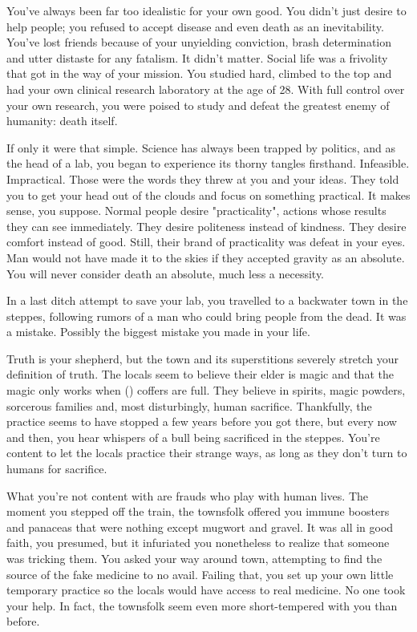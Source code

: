 \documentclass[char]{guildcamp4}
\begin{document}
\name{\cOutsider{}}

You've always been far too idealistic for your own good. You didn't just desire to help people; you refused to accept disease and even death as an inevitability. You've lost friends because of your unyielding conviction, brash determination and utter distaste for any fatalism. It didn't matter. Social life was a frivolity that got in the way of your mission. You studied hard, climbed to the top and had your own clinical research laboratory at the age of 28. With full control over your own research, you were poised to study and defeat the greatest enemy of humanity: death itself.

If only it were that simple. Science has always been trapped by politics, and as the head of a lab, you began to experience its thorny tangles firsthand. Infeasible. Impractical. Those were the words they threw at you and your ideas. They told you to get your head out of the clouds and focus on something practical. It makes sense, you suppose. Normal people desire "practicality", actions whose results they can see immediately. They desire politeness instead of kindness. They desire comfort instead of good. Still, their brand of practicality was defeat in your eyes. Man would not have made it to the skies if they accepted gravity as an absolute. You will never consider death an absolute, much less a necessity.

In a last ditch attempt to save your lab, you travelled to a backwater town in the steppes, following rumors of a man who could bring people from the dead. It was a mistake. Possibly the biggest mistake you made in your life.

Truth is your shepherd, but the town and its superstitions severely stretch your definition of truth. The locals seem to believe their elder is magic and that the magic only works when \cElder(\their) coffers are full. They believe in spirits, magic powders, sorcerous families and, most disturbingly, human sacrifice. Thankfully, the practice seems to have stopped a few years before you got there, but every now and then, you hear whispers of a bull being sacrificed in the steppes. You're content to let the locals practice their strange ways, as long as they don't turn to humans for sacrifice.

What you're not content with are frauds who play with human lives. The moment you stepped off the train, the townsfolk offered you immune boosters and panaceas that were nothing except mugwort and gravel. It was all in good faith, you presumed, but it infuriated you nonetheless to realize that someone was tricking them. You asked your way around town, attempting to find the source of the fake medicine to no avail. Failing that, you set up your own little temporary practice so the locals would have access to real medicine. No one took your help. In fact, the townsfolk seem even more short-tempered with you than before.
\end{document}
